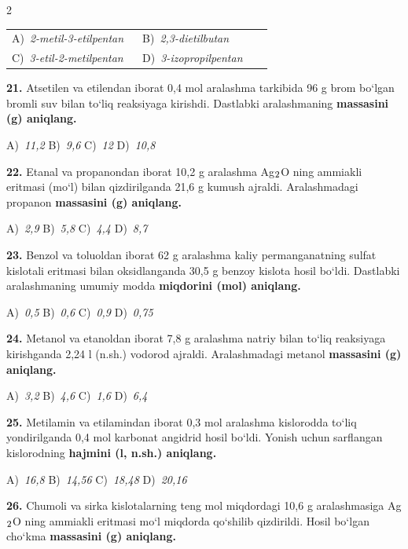 \documentclass[11pt,a4paper]{article}
\renewcommand{\textsubscript}[1]{\ensuremath{_{\text{\fontsize{8}{8}\selectfont #1}}}}
\begin{document}
\begin{multicols}{2}
\noindent\begin{tabular}{@{}p{0.47\linewidth}@{}p{0.47\linewidth}@{}}
A)~\textsl{2-metil-3-etilpentan} & B)~\textsl{2,3-dietilbutan} \\
C)~\textsl{3-etil-2-metilpentan} & D)~\textsl{3-izopropilpentan} \\
\end{tabular}\par
\vspace{4pt}
\noindent\textbf{21.} Atsetilen va etilendan iborat 0,4 mol aralashma tarkibida 96 g brom bo`lgan bromli suv bilan to`liq reaksiyaga kirishdi. Dastlabki aralashmaning \textbf{massasini (g) aniqlang.}

\noindent A)~\textsl{11,2} \hfill B)~\textsl{9,6} \hfill C)~\textsl{12} \hfill D)~\textsl{10,8}\par
\vspace{4pt}
\noindent\textbf{22.} Etanal va propanondan iborat 10,2 g aralashma Ag\textsubscript{2}O ning ammiakli eritmasi (mo`l) bilan qizdirilganda 21,6 g kumush ajraldi. Aralashmadagi propanon \textbf{massasini (g) aniqlang.}

\noindent A)~\textsl{2,9} \hfill B)~\textsl{5,8} \hfill C)~\textsl{4,4} \hfill D)~\textsl{8,7}\par
\vspace{4pt}
\noindent\textbf{23.} Benzol va toluoldan iborat 62 g aralashma kaliy permanganatning sulfat kislotali eritmasi bilan oksidlanganda 30,5 g benzoy kislota hosil bo`ldi. Dastlabki aralashmaning umumiy modda \textbf{miqdorini (mol) aniqlang.}

\noindent A)~\textsl{0,5} \hfill B)~\textsl{0,6} \hfill C)~\textsl{0,9} \hfill D)~\textsl{0,75}\par
\vspace{4pt}
\noindent\textbf{24.} Metanol va etanoldan iborat 7,8 g aralashma natriy bilan to`liq reaksiyaga kirishganda 2,24 l (n.sh.) vodorod ajraldi. Aralashmadagi metanol \textbf{massasini (g) aniqlang.}

\noindent A)~\textsl{3,2} \hfill B)~\textsl{4,6} \hfill C)~\textsl{1,6} \hfill D)~\textsl{6,4}\par
\vspace{4pt}
\noindent\textbf{25.} Metilamin va etilamindan iborat 0,3 mol aralashma kislorodda to`liq yondirilganda 0,4 mol karbonat angidrid hosil bo`ldi. Yonish uchun sarflangan kislorodning \textbf{hajmini (l, n.sh.) aniqlang.}

\noindent A)~\textsl{16,8} \hfill B)~\textsl{14,56} \hfill C)~\textsl{18,48} \hfill D)~\textsl{20,16}\par
\vspace{4pt}
\noindent\textbf{26.} Chumoli va sirka kislotalarning teng mol miqdordagi 10,6 g aralashmasiga Ag\textsubscript{2}O ning ammiakli eritmasi mo`l miqdorda qo`shilib qizdirildi. Hosil bo`lgan cho`kma \textbf{massasini (g) aniqlang.}


\end{multicols}
\end{document}
